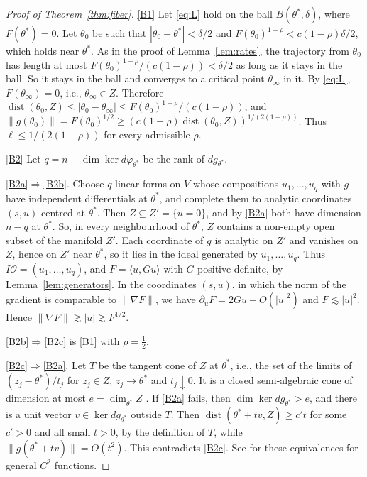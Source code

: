 \documentclass[11pt]{article}
\theoremstyle{definition}
\theoremstyle{remark}
\newcommand{\cO}{\mathcal{O}}
\newcommand{\ip}[2]{\langle #1,#2\rangle}
\DeclareMathOperator{\dist}{dist}
\begin{document}
\begin{proof}[Proof of Theorem~\ref{thm:fiber}]
\ref{B1} Let \eqref{eq:L} hold on the ball $B(\theta^*,\delta)$, where $F(\theta^*)=0$. Let $\theta_0$ be such that $|\theta_0-\theta^*|<\delta/2$ and $F(\theta_0)^{1-\rho}<c(1-\rho)\delta/2$, which holds near $\theta^*$. As in the proof of Lemma~\ref{lem:rates}, the trajectory from $\theta_0$ has length at most $F(\theta_0)^{1-\rho}/(c(1-\rho))<\delta/2$ as long as it stays in the ball. So it stays in the ball and converges to a critical point $\theta_\infty$ in it. By \eqref{eq:L}, $F(\theta_\infty)=0$, i.e., $\theta_\infty\in Z$. Therefore $\dist(\theta_0,Z)\le|\theta_0-\theta_\infty|\le F(\theta_0)^{1-\rho}/(c(1-\rho))$, and $\|g(\theta_0)\|=F(\theta_0)^{1/2}\ge(c(1-\rho)\dist(\theta_0,Z))^{1/(2(1-\rho))}$. Thus $\ell\le1/(2(1-\rho))$ for every admissible $\rho$.

\ref{B2} Let $q=n-\dim\ker d\varphi_{\theta^*}$ be the rank of $dg_{\theta^*}$.

\ref{B2a}$\Rightarrow$\ref{B2b}. Choose $q$ linear forms on $V$ whose compositions $u_1,\dots,u_q$ with $g$ have independent differentials at $\theta^*$, and complete them to analytic coordinates $(s,u)$ centred at $\theta^*$. Then $Z\subseteq Z'=\{u=0\}$, and by \ref{B2a} both have dimension $n-q$ at $\theta^*$. So, in every neighbourhood of $\theta^*$, $Z$ contains a non-empty open subset of the manifold $Z'$. Each coordinate of $g$ is analytic on $Z'$ and vanishes on $Z$, hence on $Z'$ near $\theta^*$, so it lies in the ideal generated by $u_1,\dots,u_q$. Thus $I\cO=(u_1,\dots,u_q)$, and $F=\ip{u}{Gu}$ with $G$ positive definite, by Lemma~\ref{lem:generators}. In the coordinates $(s,u)$, in which the norm of the gradient is comparable to $\|\nabla F\|$, we have $\partial_uF=2Gu+O(|u|^2)$ and $F\lesssim|u|^2$. Hence $\|\nabla F\|\gtrsim|u|\gtrsim F^{1/2}$.

\ref{B2b}$\Rightarrow$\ref{B2c} is \ref{B1} with $\rho=\frac12$.

\ref{B2c}$\Rightarrow$\ref{B2a}. Let $T$ be the tangent cone of $Z$ at $\theta^*$, i.e., the set of the limits of $(z_j-\theta^*)/t_j$ for $z_j\in Z$, $z_j\to\theta^*$ and $t_j\downarrow0$. It is a closed semi-algebraic cone of dimension at most $e=\dim_{\theta^*}Z$ \cite[\S2.8]{BCR98}. If \ref{B2a} fails, then $\dim\ker dg_{\theta^*}>e$, and there is a unit vector $v\in\ker dg_{\theta^*}$ outside $T$. Then $\dist(\theta^*+tv,Z)\ge c't$ for some $c'>0$ and all small $t>0$, by the definition of $T$, while $\|g(\theta^*+tv)\|=O(t^2)$. This contradicts \ref{B2c}. See \cite{RB24} for these equivalences for general $C^2$ functions.


\end{proof}
\end{document}
